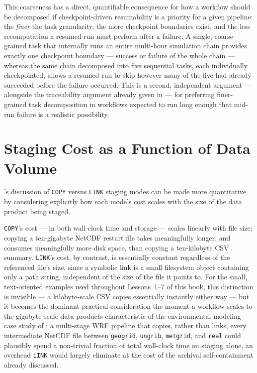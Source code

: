 This coarseness has a direct, quantifiable consequence for how a workflow
should be decomposed if checkpoint-driven resumability is a priority for a
given pipeline: the \emph{finer} the task granularity, the more checkpoint
boundaries exist, and the less recomputation a resumed run must perform
after a failure. A single, coarse-grained task that internally runs an
entire multi-hour simulation chain provides exactly one checkpoint boundary
--- success or failure of the whole chain --- whereas the same chain
decomposed into five sequential tasks, each individually checkpointed,
allows a resumed run to skip however many of the five had already
succeeded before the failure occurred. This is a second, independent
argument --- alongside the traceability argument already given in
 --- for preferring finer-grained task
decomposition in workflows expected to run long enough that mid-run failure
is a realistic possibility.

\section{Staging Cost as a Function of Data Volume}

's discussion of \texttt{COPY} versus \texttt{LINK}
staging modes can be made more quantitative by considering explicitly how
each mode's cost scales with the size of the data product being staged.

\texttt{COPY}'s cost --- in both wall-clock time and storage --- scales
linearly with file size: copying a ten-gigabyte NetCDF restart file takes
meaningfully longer, and consumes meaningfully more disk space, than copying
a ten-kilobyte CSV summary. \texttt{LINK}'s cost, by contrast, is
essentially constant regardless of the referenced file's size, since a
symbolic link is a small filesystem object containing only a path string,
independent of the size of the file it points to. For the small,
text-oriented examples used throughout Lessons~1--7 of this book, this
distinction is invisible --- a kilobyte-scale CSV copies essentially
instantly either way --- but it becomes the dominant practical
consideration the moment a workflow scales to the gigabyte-scale data
products characteristic of the environmental modeling case study of
: a multi-stage WRF pipeline that copies, rather than
links, every intermediate NetCDF file between \texttt{geogrid},
\texttt{ungrib}, \texttt{metgrid}, and \texttt{real} could plausibly spend
a non-trivial fraction of total wall-clock time on staging alone, an
overhead \texttt{LINK} would largely eliminate at the cost of the
archival self-containment  already discussed.

